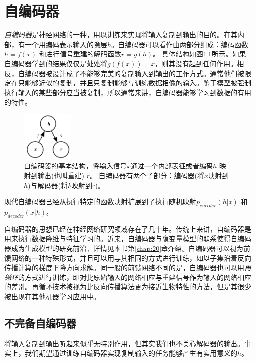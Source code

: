 
\chapter{自编码器}
\label{chap:14}

\emph{自编码器}是神经网络的一种，用以训练来实现将输入复制到输出的目的。在其内部，有一个用编码表示输入的隐层$h$。自编码器可以看作由两部分组成：编码函数$h = f(x)$ 和进行信号重建的解码函数$r = g(h)$。 具体结构如图\ref{fig:14.1}所示。如果自编码器学到的结果仅仅是处处将$g(f(x)) = x$，则其没有起到任何作用。相反，自编码器被设计成了不能够完美的复制输入到输出的工作方式。通常他们被限定在只能够近似的复制，并且只复制能够与训练数据相像的输入。鉴于模型被强制执行输入的某些部分应当被复制，所以通常来讲，自编码器能够学习到数据的有用的特性。
\begin{figure}[htbp] %
   \centering
   \includegraphics[width=1in]{fig/chap14/14_1.png} 
   \caption{自编码器的基本结构，将输入信号$x$通过一个内部表征或者编码$h$ 映射到输出(也叫重建) $r$。 自编码器有两个子部分：编码器(将$x$映射到$h$)与解码器(将$h$映射到$r$)。}
   \label{fig:14.1}
\end{figure}

现代自编码器已经从执行特定的函数映射扩展到了执行随机映射$p_{encoder}(h|x)$ 和 $p_{decoder}(x|h)$。

自编码器的思想已经在神经网络研究领域存在了几十年。传统上来讲，自编码器是用来执行数据降维与特征学习的。近来，自编码器与隐变量模型的联系使得自编码器成为生成模型的研究前沿，详情见本书第\ref{chap:20}章介绍。自编码器可以视为前馈网络的一种特殊形式，并且可以用与其相同的方式进行训练，如以子集沿着反向传播计算的梯度下降方向求解。同一般的前馈网络不同的是，自编码器也可以用\emph{再循环}的方式进行训练，即对比原始输入的网络相应与重建信号作为输入的网络相应的差别。再循环技术被视为比反向传播算法更为接近生物特性的方法，但是其很少被出现在其他机器学习应用中。

\section{不完备自编码器}
\label{sec:14.1}
将输入复制到输出听起来似乎无特别作用，但其实我们也不关心解码器的输出。事实上，我们期望通过训练自编码器实现复制输入的任务能够产生有实用意义的$h$。

